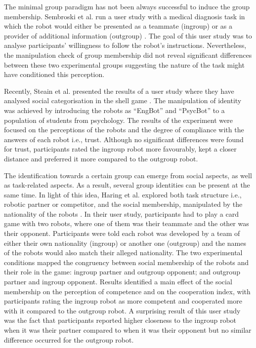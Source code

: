 The minimal group paradigm has not been always successful to induce the group membership. Sembroski et al. run a user study with a medical diagnosis task in which the robot would either be presented as a teammate (ingroup) or as a provider of additional information (outgroup) \cite{sembroski2017he}. The goal of this user study was to analyse participants' willingness to follow the robot's instructions. Nevertheless, the manipulation check of group membership did not reveal significant differences between these two experimental groups suggesting the nature of the task might have conditioned this perception.


Recently, Steain et al. presented the results of a user study where they have analysed social categorisation in the shell game \cite{steain2019black}. The manipulation of identity was achieved by introducing the robots as ``EngBot'' and ``PsycBot'' to a population of students from psychology. The results of the experiment were focused on the perceptions of the robots and the degree of compliance with the answers of each robot i.e., trust. Although no significant differences were found for trust, participants rated the ingroup robot more favourably, kept a closer distance and preferred it more compared to the outgroup robot.


The identification towards a certain group can emerge from social aspects, as well as task-related aspects. As a result, several group identities can be present at the same time. In light of this idea, Haring et al. explored both task structure i.e., robotic partner or competitor, and the social membership, manipulated by the nationality of the robots \cite{haring2014would}. In their user study, participants had to play a card game with two robots, where one of them was their teammate and the other was their opponent. Participants were told each robot was developed by a team of either their own nationality (ingroup) or another one (outgroup) and the names of the robots would also match their alleged nationality. The two experimental conditions mapped the congruency between social membership of the robots and their role in the game: ingroup partner and outgroup opponent; and outgroup partner and ingroup opponent. Results identified a main effect of the social membership on the perception of competence and on the cooperation index, with participants rating the ingroup robot as more competent and cooperated more with it compared to the outgroup robot. A surprising result of this user study was the fact that participants reported higher closeness to the ingroup robot when it was their partner compared to when it was their opponent but no similar difference occurred for the outgroup robot.


